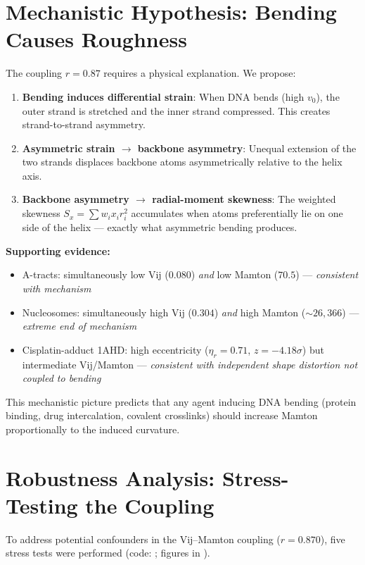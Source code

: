 \section{Mechanistic Hypothesis: Bending Causes Roughness}

The coupling $r = 0.87$ requires a physical explanation. We propose:

\begin{enumerate}
    \item \textbf{Bending induces differential strain}: When DNA bends (high $v_0$), the outer strand is stretched and the inner strand compressed. This creates strand-to-strand asymmetry.
    \item \textbf{Asymmetric strain $\rightarrow$ backbone asymmetry}: Unequal extension of the two strands displaces backbone atoms asymmetrically relative to the helix axis.
    \item \textbf{Backbone asymmetry $\rightarrow$ radial-moment skewness}: The weighted skewness $S_x = \sum w_i x_i r_i^2$ accumulates when atoms preferentially lie on one side of the helix --- exactly what asymmetric bending produces.
\end{enumerate}

\textbf{Supporting evidence:}
\begin{itemize}
    \item A-tracts: simultaneously low Vij ($0.080$) \textit{and} low Mamton ($70.5$) --- \textit{consistent with mechanism}
    \item Nucleosomes: simultaneously high Vij ($0.304$) \textit{and} high Mamton ($\sim 26{,}366$) --- \textit{extreme end of mechanism}
    \item Cisplatin-adduct 1AHD: high eccentricity ($\eta_r = 0.71$, $z = -4.18\sigma$) but intermediate Vij/Mamton --- \textit{consistent with independent shape distortion not coupled to bending}
\end{itemize}

This mechanistic picture predicts that any agent inducing DNA bending (protein binding, drug intercalation, covalent crosslinks) should increase Mamton proportionally to the induced curvature.

\section{Robustness Analysis: Stress-Testing the Coupling}

To address potential confounders in the Vij--Mamton coupling ($r = 0.870$), five stress tests were performed (code: ; figures in ).

